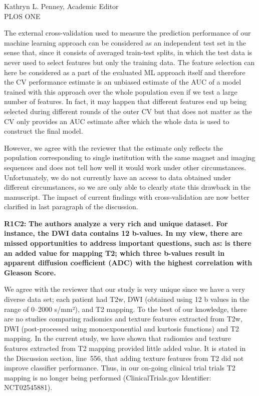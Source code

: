 \documentclass{letter}
\newenvironment{comment}[1]%
  {\vspace{5ex}\par\textbf{#1:}\ignorespaces\bfseries}%
  {\par\ignorespacesafterend}
\newenvironment{reply}%
  {\vspace{2ex}\par}%
  {\par\upshape}
\begin{document}
\begin{letter}{Kathryn L. Penney, Academic Editor \\ PLOS ONE}
\begin{reply}
The external cross-validation used to measure the prediction performance 
of our machine learning approach can be considered as an independent 
test set in the sense that, since it consists of averaged train-test 
splits, in which the test data is never used to select features but only 
the training data. The feature selection can here be considered as a 
part of the evaluated ML approach itself and therefore the CV 
performance estimate is an unbiased estimate of the AUC of a model 
trained with this approach over the whole population even if we test a 
large number of features. In fact, it may happen that different features 
end up being selected during different rounds of the outer CV but that 
does not matter as the CV only provides an AUC estimate after which the 
whole data is used to construct the final model.

However, we agree with the reviewer that the estimate only reflects the 
population corresponding to single institution with the same magnet and 
imaging sequences and does not tell how well it would work under other 
circumstances. Unfortunately, we do not currently have an access to data 
obtained under different circumstances, so we are only able to 
clearly state this drawback in the manuscript. The impact of current findings with cross-validation are now better clarified in last paragraph of the discussion. 
\end{reply}


\begin{comment}{R1C2}
The authors analyze a very rich and unique dataset. For instance, the DWI data
contains 12 b-values. In my view, there are missed opportunities to address
important questions, such as: is there an added value for mapping T2; which
three b-values result in apparent diffusion coefficient (ADC) with the highest
correlation with Gleason Score.
\end{comment}

\begin{reply}
We agree with the reviewer that our study is very unique since we have a very diverse data set; each patient had T2w, DWI (obtained using 12 b values in the range of 0–2000 s/mm²), and T2 mapping. To the best of our knowledge, there are no studies comparing radiomics and texture features extracted from T2w, DWI (post-processed using monoexponential and kurtosis functions) and T2 mapping. In the current study, we have shown that radiomics and texture features extracted from T2 mapping provided little added value. It is stated in the Discussion section, line~556, that adding texture features from T2 did not improve classifier performance. Thus, in our on-going clinical trial trials T2 mapping is no longer being performed (ClinicalTrials.gov Identifier: NCT02545881).  


\end{reply}
\end{letter}
\end{document}
